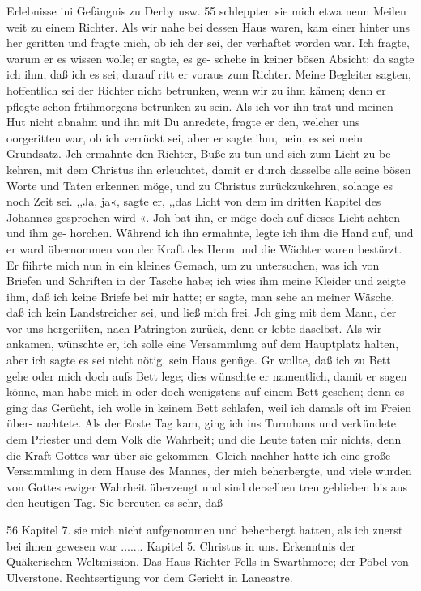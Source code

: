 Erlebnisse ini Gefängnis zu Derby usw. 55
schleppten sie mich etwa neun Meilen weit zu einem Richter.
Als wir nahe bei dessen Haus waren, kam einer hinter uns her
geritten und fragte mich, ob ich der sei, der verhaftet worden
war. Ich fragte, warum er es wissen wolle; er sagte, es ge-
schehe in keiner bösen Absicht; da sagte ich ihm, daß ich es
sei; darauf ritt er voraus zum Richter. Meine Begleiter sagten,
hoffentlich sei der Richter nicht betrunken, wenn wir zu ihm
kämen; denn er pflegte schon frtihmorgens betrunken zu sein.
Als ich vor ihn trat und meinen Hut nicht abnahm und ihn mit
Du anredete, fragte er den, welcher uns oorgeritten war, ob ich
verrückt sei, aber er sagte ihm, nein, es sei mein Grundsatz. Jch
ermahnte den Richter, Buße zu tun und sich zum Licht zu be-
kehren, mit dem Christus ihn erleuchtet, damit er durch dasselbe
alle seine bösen Worte und Taten erkennen möge, und zu Christus
zurückzukehren, solange es noch Zeit sei. ,,Ja, ja«, sagte er, ,,das
Licht von dem im dritten Kapitel des Johannes gesprochen wird-«.
Joh bat ihn, er möge doch auf dieses Licht achten und ihm ge-
horchen. Während ich ihn ermahnte, legte ich ihm die Hand auf,
und er ward übernommen von der Kraft des Herm und die
Wächter waren bestürzt. Er fiihrte mich nun in ein kleines Gemach,
um zu untersuchen, was ich von Briefen und Schriften in der
Tasche habe; ich wies ihm meine Kleider und zeigte ihm, daß
ich keine Briefe bei mir hatte; er sagte, man sehe an meiner
Wäsche, daß ich kein Landstreicher sei, und ließ mich frei. Jch
ging mit dem Mann, der vor uns hergeriiten, nach Patrington
zurück, denn er lebte daselbst. Als wir ankamen, wünschte er, ich
solle eine Versammlung auf dem Hauptplatz halten, aber ich sagte
es sei nicht nötig, sein Haus genüge. Gr wollte, daß ich zu Bett
gehe oder mich doch aufs Bett lege; dies wünschte er namentlich,
damit er sagen könne, man habe mich in oder doch wenigstens
auf einem Bett gesehen; denn es ging das Gerücht, ich wolle
in keinem Bett schlafen, weil ich damals oft im Freien über-
nachtete. Als der Erste Tag kam, ging ich ins Turmhans
und verkündete dem Priester und dem Volk die Wahrheit; und
die Leute taten mir nichts, denn die Kraft Gottes war über sie
gekommen. Gleich nachher hatte ich eine große Versammlung in
dem Hause des Mannes, der mich beherbergte, und viele wurden
von Gottes ewiger Wahrheit überzeugt und sind derselben treu
geblieben bis aus den heutigen Tag. Sie bereuten es sehr, daß


56 Kapitel 7.
sie mich nicht aufgenommen und beherbergt hatten, als ich zuerst
bei ihnen gewesen war .......
Kapitel 5.
Christus in uns. Erkenntnis der Quäkerischen Weltmission. Das
Haus Richter Fells in Swarthmore; der Pöbel von Ulverstone.
Rechtsertigung vor dem Gericht in Laneastre.


